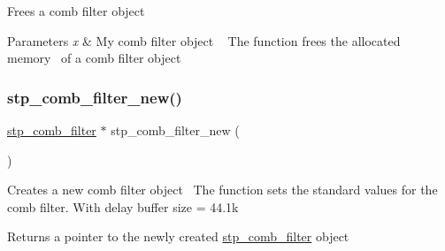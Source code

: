Frees a comb filter object~\newline
 


\begin{DoxyParams}{Parameters}
{\em x} & My comb filter object ~\newline
 The function frees the allocated memory~\newline
 of a comb filter object \\
\hline
\end{DoxyParams}
\mbox{\label{structstp__comb__filter_a9003efe4c8aa14593421023d68dd4561}} 
\subsubsection{\texorpdfstring{stp\+\_\+comb\+\_\+filter\+\_\+new()}{stp\_comb\_filter\_new()}}
{\footnotesize\ttfamily \hyperlink{structstp__comb__filter}{stp\+\_\+comb\+\_\+filter} $\ast$ stp\+\_\+comb\+\_\+filter\+\_\+new (\begin{DoxyParamCaption}{ }\end{DoxyParamCaption})\hspace{0.3cm}{\ttfamily [related]}}



Creates a new comb filter object~\newline
 The function sets the standard values for the comb filter. With delay buffer size = 44.\+1k ~\newline
 

\begin{DoxyReturn}{Returns}
a pointer to the newly created \hyperlink{structstp__comb__filter}{stp\+\_\+comb\+\_\+filter} object ~\newline
 
\end{DoxyReturn}
\mbox{\label{structstp__comb__filter_af42bb71a315d240d6a4ee850d429b458}} 
